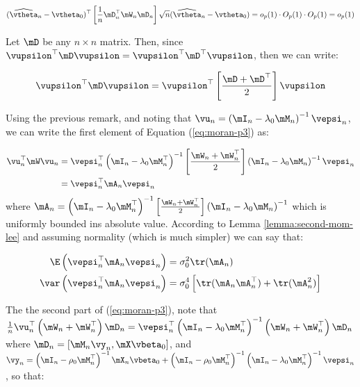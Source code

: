 \documentclass[english,12pt]{book}\usepackage[]{graphicx}\usepackage[]{xcolor}
\begin{document}
\begin{subappendices}
\begin{equation*}
(\widehat{\vtheta}_n - \vtheta_0)^\top\left[\frac{1}{n}\mD_n^\top\mW_n\mD_n\right]\sqrt{n}(\widehat{\vtheta}_n - \vtheta_0)= o_p(1)\cdot O_p(1)\cdot O_p(1) = o_p(1)
\end{equation*}

\begin{remark}
Let $\mD$ be any $n\times n$ matrix. Then, since $\vupsilon^\top\mD\vupsilon = \vupsilon^\top\mD^\top\vupsilon$, then we can write:

\begin{equation}
\vupsilon^\top\mD\vupsilon = \vupsilon^\top\left[\frac{\mD + \mD^\top}{2}\right]\vupsilon
\end{equation}
\end{remark}

Using the previous remark, and noting that $\vu_n = \left(\mI_n-\lambda_0\mM_n\right)^{-1}\vepsi_n$, we can write the first element of Equation (\ref{eq:moran-p3}) as:

\begin{equation}
\begin{aligned}
\vu_n^\top\mW\vu_n &=\vepsi_n^\top\left(\mI_n-\lambda_0\mM_n^\top\right)^{-1}\left[\frac{\mW_n + \mW_n^\top}{2}\right]\left(\mI_n-\lambda_0\mM_n\right)^{-1}\vepsi_n \\
& = \vepsi_n^\top\mA_n\vepsi_n
\end{aligned}
\end{equation}
%
where $\mA_n = \left(\mI_n-\lambda_0\mM_n^\top\right)^{-1}\left[\frac{\mW_n + \mW_n^\top}{2}\right]\left(\mI_n-\lambda_0\mM_n\right)^{-1}$ which is uniformly bounded ins absolute value. According to Lemma \ref{lemma:second-mom-lee} and assuming normality (which is much simpler) we can say that:

\begin{equation}
  \begin{aligned}
    \E\left(\vepsi_n^\top\mA_n\vepsi_n\right) & = \sigma_0^2\tr(\mA_n) \\
    \var\left(\vepsi_n^\top\mA_n\vepsi_n\right) & = \sigma^4_0\left[\tr(\mA_n\mA_n^\top)+\tr(\mA^2_n)\right]
  \end{aligned}
\end{equation}

The the second part of (\ref{eq:moran-p3}), note that $\frac{1}{n}\vu_n^\top\left(\mW_n + \mW_n^\top\right)\mD_n =\vepsi_n^\top\left(\mI_n-\lambda_0\mM_n^\top\right)^{-1}\left(\mW_n + \mW_n^\top\right)\mD_n$ where $\mD_n = \left[\mM_n\vy_n, \mX\vbeta_0\right]$, and $\vy_n = \left(\mI_n-\rho_0\mM_n^\top\right)^{-1}\mX_n\vbeta_0 + \left(\mI_n-\rho_0\mM_n^\top\right)^{-1}\left(\mI_n-\lambda_0\mM_n^\top\right)^{-1}\vepsi_n$, so that:


\end{subappendices}
\end{document}
